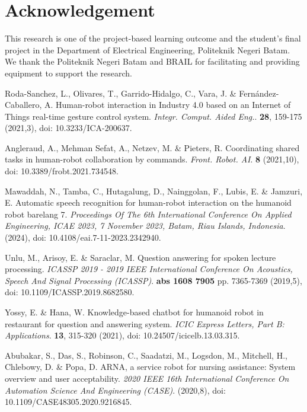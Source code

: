 \documentclass{../styles/svproc}
\begin{document}
\section*{Acknowledgement}
This research is one of the project-based learning outcome and the student's final project in the Department of Electrical Engineering, Politeknik Negeri Batam. We thank the Politeknik Negeri Batam and BRAIL for facilitating and providing equipment to support the research.

%
%
\begin{thebibliography}{9}
	
	Roda-Sanchez, L., Olivares, T., Garrido-Hidalgo, C., Vara, J. \& Fernández-Caballero, A. Human-robot interaction in Industry 4.0 based on an Internet of Things real-time gesture control system. {\em Integr. Comput. Aided Eng.}. \textbf{28}, 159-175 (2021,3), doi: 10.3233/ICA-200637.
	
	Angleraud, A., Mehman Sefat, A., Netzev, M. \& Pieters, R. Coordinating shared tasks in human-robot collaboration by commands. {\em Front. Robot. AI}. \textbf{8} (2021,10), doi: 10.3389/frobt.2021.734548.
	
	Mawaddah, N., Tamba, C., Hutagalung, D., Nainggolan, F., Lubis, E. \& Jamzuri, E. Automatic speech recognition for human-robot interaction on the humanoid robot barelang 7. {\em Proceedings Of The 6th International Conference On Applied Engineering, ICAE 2023, 7 November 2023, Batam, Riau Islands, Indonesia}. (2024), doi: 10.4108/eai.7-11-2023.2342940.
	
	Unlu, M., Arisoy, E. \& Saraclar, M. Question answering for spoken lecture processing. {\em ICASSP 2019 - 2019 IEEE International Conference On Acoustics, Speech And Signal Processing (ICASSP)}. \textbf{abs 1608 7905} pp. 7365-7369 (2019,5), doi: 10.1109/ICASSP.2019.8682580.

	Yossy, E. \& Hana, W. Knowledge-based chatbot for humanoid robot in restaurant for question and answering system. {\em ICIC Express Letters, Part B: Applications}. \textbf{13}, 315-320 (2021), doi: 10.24507/icicelb.13.03.315.
		
	Abubakar, S., Das, S., Robinson, C., Saadatzi, M., Logsdon, M., Mitchell, H., Chlebowy, D. \& Popa, D. ARNA, a service robot for nursing assistance: System overview and user acceptability. {\em 2020 IEEE 16th International Conference On Automation Science And Engineering (CASE)}. (2020,8), doi: 10.1109/CASE48305.2020.9216845.
		

\end{thebibliography}
\end{document}
